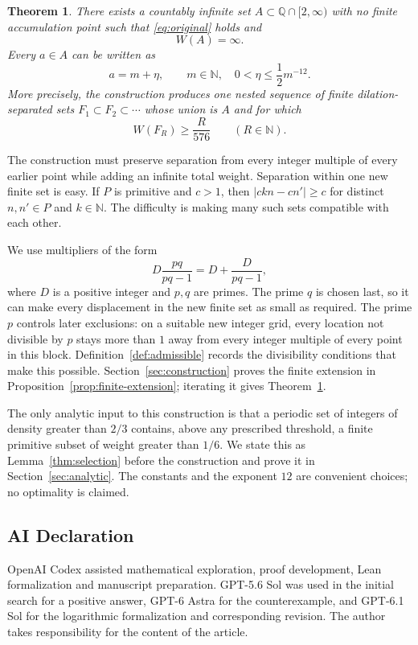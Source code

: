\documentclass[11pt,reqno]{amsart}
\newtheorem{theorem}{Theorem}[section]
\theoremstyle{definition}
\theoremstyle{remark}
\numberwithin{equation}{section}
\newcommand{\N}{\mathbb N}
\newcommand{\Q}{\mathbb Q}
\begin{document}
\begin{theorem}\label{thm:main}
There exists a countably infinite set $A\subset\Q\cap[2,\infty)$ with
no finite accumulation point such that \eqref{eq:original} holds and
\begin{equation}\label{eq:divergence}
 W(A)=\infty.
\end{equation}
Every $a\in A$ can be written as
\begin{equation}\label{eq:near-integer}
 a=m+\eta,
 \qquad m\in\N,\quad 0<\eta\leq\frac12m^{-12}.
\end{equation}
More precisely, the construction produces one nested sequence of finite
dilation-separated sets $F_1\subset F_2\subset\cdots$ whose union is $A$ and for which
\begin{equation}\label{eq:prefix-weight}
 W(F_R)\geq\frac{R}{576}\qquad(R\in\N).
\end{equation}
\end{theorem}

The construction must preserve separation from every integer multiple
of every earlier point while adding an infinite total weight.
Separation within one new finite set is easy. If $P$ is primitive and $c>1$, then
$|ckn-cn'|\geq c$ for distinct $n,n'\in P$ and $k\in\N$.
The difficulty is making many such sets compatible with each other.

We use multipliers of the form
\[
 D\frac{pq}{pq-1}=D+\frac{D}{pq-1},
\]
where $D$ is a positive integer and $p,q$ are primes. The prime $q$ is chosen
last, so it can make every displacement in the new finite set as small
as required. The prime $p$ controls later exclusions: on a suitable
new integer grid, every location not divisible by $p$ stays more than
$1$ away from every integer multiple of every point in this block.
Definition~\ref{def:admissible} records the divisibility conditions
that make this possible.
Section~\ref{sec:construction} proves the finite extension in
Proposition~\ref{prop:finite-extension}; iterating it gives
Theorem~\ref{thm:main}.

The only analytic input to this construction is that a periodic set of
integers of density greater than $2/3$ contains, above any prescribed
threshold, a finite primitive subset of weight greater than $1/6$.
We state this as Lemma~\ref{thm:selection} before the construction and
prove it in Section~\ref{sec:analytic}. The constants and the exponent
$12$ are convenient choices; no optimality is claimed.

\subsection*{AI Declaration}
OpenAI Codex assisted mathematical exploration, proof development,
Lean formalization and manuscript preparation. GPT-5.6 Sol was used
in the initial search for a positive answer, GPT-6 Astra for the
counterexample, and GPT-6.1 Sol for the logarithmic formalization
and corresponding revision. The author takes responsibility for
the content of the article.
\end{document}

